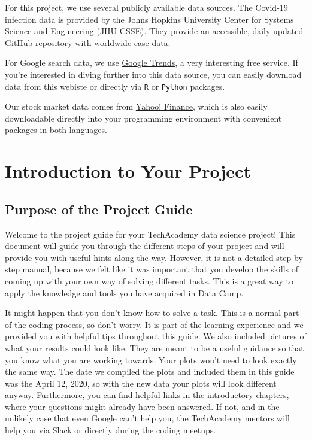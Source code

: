 \documentclass[
  11pt,
]{article}
\begin{document}
For this project, we use several publicly available data sources. The Covid-19 infection data is provided by the Johns Hopkins University Center for Systems Science and Engineering (JHU CSSE). They provide an accessible, daily updated \href{https://github.com/CSSEGISandData/COVID-19}{GitHub repository} with worldwide case data.

For Google search data, we use \href{https://trends.google.com/}{Google Trends}, a very interesting free service. If you're interested in diving further into this data source, you can easily download data from this webiste or directly via \texttt{R} or \texttt{Python} packages.

Our stock market data comes from \href{finance.yahoo.com}{Yahoo! Finance}, which is also easily downloadable directly into your programming environment with convenient packages in both languages.

\newpage

\hypertarget{introduction-to-your-project}{%
\section{Introduction to Your Project}\label{introduction-to-your-project}}

\hypertarget{purpose-of-the-project-guide}{%
\subsection{Purpose of the Project Guide}\label{purpose-of-the-project-guide}}

Welcome to the project guide for your TechAcademy data science project! This document will guide you through the different steps of your project and will provide you with useful hints along the way. However, it is not a detailed step by step manual, because we felt like it was important that you develop the skills of coming up with your own way of solving different tasks. This is a great way to apply the knowledge and tools you have acquired in Data Camp.

It might happen that you don't know how to solve a task. This is a normal part of the coding process, so don't worry. It is part of the learning experience and we provided you with helpful tips throughout this guide. We also included pictures of what your results could look like. They are meant to be a useful guidance so that you know what you are working towards. Your plots won't need to look exactly the same way. The date we compiled the plots and included them in this guide was the April 12, 2020, so with the new data your plots will look different anyway.
Furthermore, you can find helpful links in the introductory chapters, where your questions might already have been answered. If not, and in the unlikely case that even Google can't help you, the TechAcademy mentors will help you via Slack or directly during the coding meetups.
\end{document}
